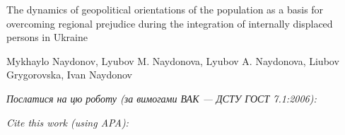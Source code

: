 \documentclass[a4paper,14pt]{extarticle}
\newcommand{\articleTitleUkr}{
The dynamics of geopolitical orientations of the population as a basis for overcoming regional prejudice during the integration of internally displaced persons in Ukraine}
\newcommand{\authorFullNameUkr}{Mykhaylo Naydonov, Lyubov M. Naydonova, Lyubov A. Naydonova, Liubov Grygorovska, Ivan Naydonov}
\begin{document}
\begin{center}\bf
\par\MakeUppercase\articleTitleUkr
\par\authorFullNameUkr
\end{center}

\par\bigskip\textit{Послатися на цю роботу (за вимогами ВАК --- ДСТУ ГОСТ 7.1:2006):}
\par{}
\par\bigskip\textit{Cite this work (using APA):}
\par{}

\end{document}
